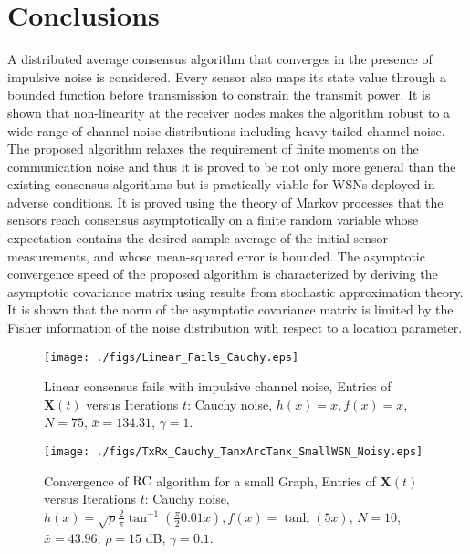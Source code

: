 \documentclass[onecolumn, draft, 12pt]{IEEEtran}
\newcommand{\rnld}{\rm RC}
\newcommand{\xbar}{\bar{x}}
\begin{document}
\section{Conclusions} \label{Sec:Conclusions:consensus_robust}
A distributed average consensus algorithm that converges in the presence of impulsive noise is considered. Every sensor also maps its state value through a bounded function before transmission to constrain the transmit power. It is shown that non-linearity at the receiver nodes makes the algorithm robust to a wide range of channel noise distributions including heavy-tailed channel noise. The proposed algorithm relaxes the requirement of finite moments on the communication noise and thus it is proved to be not only more general than the existing consensus algorithms but is practically viable for WSNs deployed in adverse conditions. It is proved using the theory of Markov processes that the sensors reach consensus asymptotically on a finite random variable whose expectation contains the desired sample average of the initial sensor measurements, and whose mean-squared error is bounded. The asymptotic convergence speed of the proposed algorithm is characterized by deriving the asymptotic covariance matrix using results from stochastic approximation theory. It is shown that the norm of the asymptotic covariance matrix is limited by the Fisher information of the noise distribution with respect to a location parameter.





\newpage

\begin{figure}[tb]
\begin{minipage}{1\textwidth}
\centering
\begin{center}
\texttt{[image: ./figs/Linear\_Fails\_Cauchy.eps]} \caption{Linear consensus fails with impulsive channel noise, Entries of $\mathbf{X}(t)$ versus Iterations $t$: Cauchy noise, $h(x)= x, f(x)= x$, $N=75$, $\xbar=134.31$, $\gamma=1$.}\label{fig:Linear_Fails_Cauchy}
\end{center}
\end{minipage}
\end{figure}

\begin{figure}[tb]
\begin{minipage}{1\textwidth}
\centering
\begin{center}
\texttt{[image: ./figs/TxRx\_Cauchy\_TanxArcTanx\_SmallWSN\_Noisy.eps]} \caption{Convergence of $\rnld$ algorithm for a small Graph, Entries of $\mathbf{X}(t)$ versus Iterations $t$: Cauchy noise, $h(x)= \sqrt{\rho} \frac{2}{\pi} \tan^{-1}(\frac{\pi}{2} 0.01 x), f(x)= \tanh(5 x)$, $N=10$, $\xbar=43.96$, $\rho=15$ dB, $\gamma=0.1$.}\label{fig:TxRx_Cauchy_TanxArcTanx_SmallWSN_Noisy}
\end{center}
\end{minipage}
\end{figure}
\end{document}
